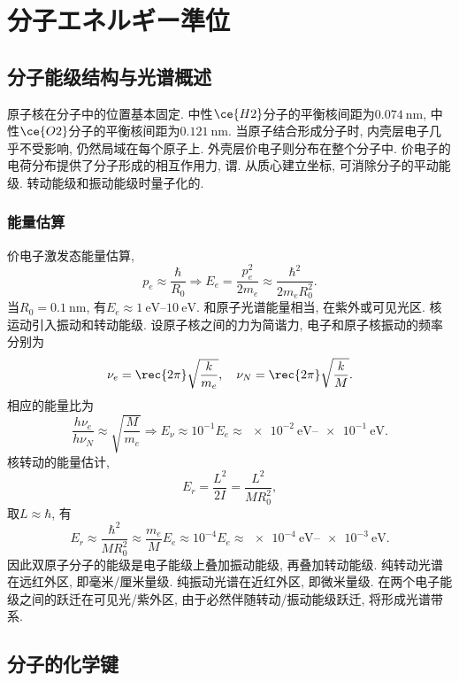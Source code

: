 \documentclass[hidelinks]{ctexart}
\begin{document}
\section{分子\textsf{エネルギー}準位} %
\label{sec:分子エネルギー準位}

\subsection{分子能级结构与光谱概述} %
\label{sub:分子能级结构与光谱概述}

 原子核在分子中的位置基本固定. 中性$\ce{H2}$分子的平衡核间距为$\SI{0.074}{\nano\meter}$, 中性$\ce{O2}$分子的平衡核间距为$\SI{0.121}{\nano\meter}$.
 当原子结合形成分子时, 内壳层电子几乎不受影响, 仍然局域在每个原子上. 外壳层价电子则分布在整个分子中. 价电子的电荷分布提供了分子形成的相互作用力, 谓.
\newpoint{}从质心建立坐标, 可消除分子的平动能级. 转动能级和振动能级时量子化的.

\subsubsection{能量估算} %
\label{ssub:能量估算}

\newpoint{}价电子激发态能量估算,
\[ p_e \approx \frac{\hbar}{R_0} \Rightarrow E_e = \frac{p_e^2}{2m_e} \approx \frac{\hbar^2}{2m_e R_0^2}. \]
当$R_0 = \SI{0.1}{\nano\meter}$, 有$E_e \approx \SIrange{1}{10}{\eV}$. 和原子光谱能量相当, 在紫外或可见光区.
\newpoint{}核运动引入振动和转动能级. 设原子核之间的力为简谐力, 电子和原子核振动的频率分别为
\[ \nu_e = \rec{2\pi}\sqrt{\frac{k}{m_e}},\quad \nu_N = \rec{2\pi}\sqrt{\frac{k}{M}}. \]
相应的能量比为
\[ \frac{h\nu_e}{h\nu_N} \approx \sqrt{\frac{M}{m_e}} \Rightarrow E_\nu \approx 10^{-1}E_e \approx \SIrange{e-2}{e-1}{\eV}. \]
\newpoint{}核转动的能量估计,
\[ E_r = \frac{L^2}{2I} = \frac{L^2}{MR_0^2}, \]
取$L\approx \hbar$, 有
\[ E_r \approx \frac{\hbar^2}{MR_0^2} \approx \frac{m_e}{M}E_e \approx 10^{-4}E_e \approx \SIrange{e-4}{e-3}{\eV}. \]
\newpoint{}因此双原子分子的能级是电子能级上叠加振动能级, 再叠加转动能级. 纯转动光谱在远红外区, 即毫米/厘米量级. 纯振动光谱在近红外区, 即微米量级. 在两个电子能级之间的跃迁在可见光/紫外区, 由于必然伴随转动/振动能级跃迁, 将形成光谱带系.



\subsection{分子的化学键} %
\label{sub:分子的化学键}
\end{document}
